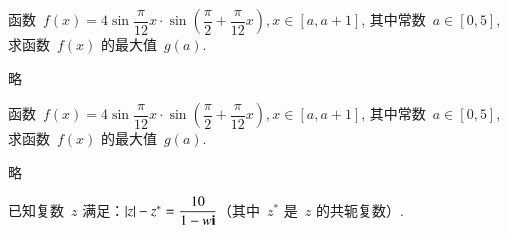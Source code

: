 \documentclass[marginline]{BHCexam}
\begin{document}
\begin{questions}
\begin{solution}
\end{solution}

\question[14] 函数~$f(x)=4\sin\dfrac{\pi}{12}x\cdot\sin
    \left(\dfrac{\pi}{2}+\dfrac{\pi}{12}x\right),x\in[a,a+1]$,
    其中常数~$a\in[0,5]$, 求函数~$f(x)$ 的最大值~$g(a)$.

\begin{solution}
略
\end{solution}


\jiandab
\question[16] 函数~$f(x)=4\sin\dfrac{\pi}{12}x\cdot\sin
    \left(\dfrac{\pi}{2}+\dfrac{\pi}{12}x\right),x\in[a,a+1]$,
    其中常数~$a\in[0,5]$, 求函数~$f(x)$ 的最大值~$g(a)$.

\begin{solution}
略
\end{solution}


\question 已知复数~$z$ 满足：$\left| z \right|-z^*=\dfrac{10}{1-w\textbf{i}}$（其中~$z^*$
是~$z$ 的共轭复数）.

\begin{solution}
\end{solution}



\end{questions}
\end{document}

